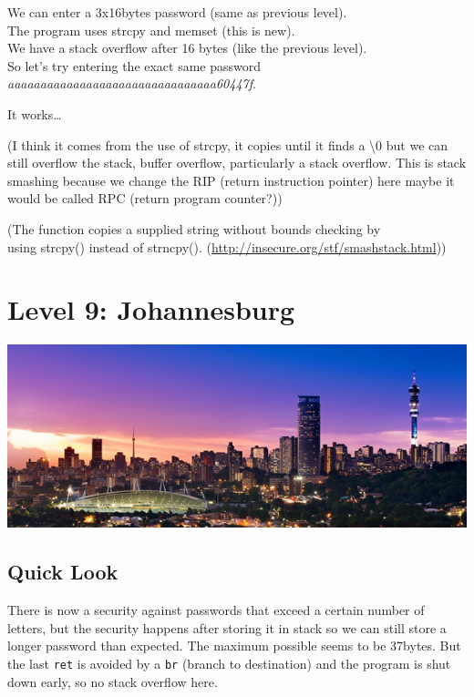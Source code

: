 We can enter a 3x16bytes password (same as previous level).\\The program
uses strcpy and memset (this is new).\\We have a stack overflow after 16
bytes (like the previous level).\\So let's try entering the exact same
password \emph{aaaaaaaaaaaaaaaaaaaaaaaaaaaaaaaa60447f}.

It works\ldots{}

(I think it comes from the use of strcpy, it copies until it finds a
\textbackslash{}0 but we can still overflow the stack, buffer overflow,
particularly a stack overflow. This is stack smashing because we change
the RIP (return instruction pointer) here maybe it would be called RPC
(return program counter?))

(The function copies a supplied string without bounds checking by\\using
strcpy() instead of strncpy().
(\url{http://insecure.org/stf/smashstack.html}))

\section{Level 9: Johannesburg}\label{level-9-johannesburg}

\includegraphics{img/9_2.PNG}

\subsection{Quick Look}\label{quick-look}

There is now a security against passwords that exceed a certain number
of letters, but the security happens after storing it in stack so we can
still store a longer password than expected. The maximum possible seems
to be 37bytes. But the last \texttt{ret} is avoided by a \texttt{br}
(branch to destination) and the program is shut down early, so no stack
overflow here.

